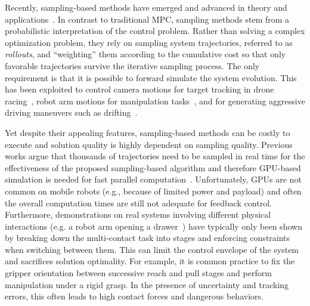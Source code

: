 Recently, sampling-based methods have emerged and advanced in theory and applications~\cite{lee_aggressive_2020,abraham_model-based_2020,williams_information_nodate,williams_information_2017,rajamaki_augmenting_2017}. 
In contrast to traditional MPC, sampling methods stem from a probabilistic interpretation of the control problem. 
Rather than solving a complex optimization problem, they rely on sampling system trajectories, referred to as \textit{rollouts}, and ``weighting'' them according to the cumulative cost so that only favorable trajectories survive the iterative sampling process. The only requirement is that it is possible to forward simulate the system evolution. This has been exploited to control camera motions for target tracking in drone racing~\cite{lee_aggressive_2020}, robot arm motions for manipulation tasks~\cite{abraham_model-based_2020}, and for generating aggressive driving maneuvers such as drifting~\cite{williams_information_nodate, williams_information_2017}. 

Yet despite their appealing features, sampling-based methods can be costly to execute and solution quality is highly dependent on sampling quality. Previous works argue that thousands of trajectories need to be sampled in real time for the effectiveness of the proposed sampling-based algorithm and therefore GPU-based simulation is needed for fast parallel computation~\cite{williams_model_2017}. 
Unfortunately, GPUs are not common on mobile robots (e.g., because of limited power and payload) and often the overall computation times are still not adequate for feedback control. 
Furthermore, demonstrations on real systems involving different physical interactions (e.g. a robot arm opening a drawer~\cite{abraham_model-based_2020}) have typically only been shown by breaking down the multi-contact task into stages and enforcing constraints when switching between them. 
This can limit the control envelope of the system and sacrifices solution optimality. For example, it is common practice to fix the gripper orientation between successive reach and pull stages and perform manipulation under a rigid grasp. In the presence of uncertainty and tracking errors, this often leads to high contact forces and dangerous behaviors.

